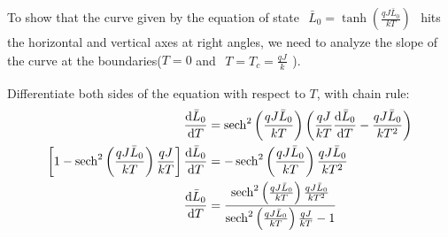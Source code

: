\documentclass[../../main.tex]{subfiles}
\begin{document}
  To show that the curve given by the equation of state $\begin{aligned}
    \bar{L}_{0} = \tanh{\left(\frac{qJ\bar{L}_{0}}{kT}\right)} 
  \end{aligned}$ hits the horizontal and vertical axes at right angles, we need to analyze the slope of the curve at the boundaries($T = 0$ and $\begin{aligned}
      T = T_{c} = \frac{qJ}{k}
    \end{aligned}$).

    Differentiate both sides of the equation with respect to $T$, with chain rule:
    \begin{align*}
      \frac{\mathrm{d}\bar{L}_{0}}{\mathrm{d}T} &= \operatorname{sech}^{2}\left(\frac{qJ\bar{L}_{0}}{kT}\right)\left(\frac{qJ}{kT}\frac{\mathrm{d}\bar{L}_{0}}{\mathrm{d}T} - \frac{qJ\bar{L}_{0}}{kT^{2}}\right)\\
      \left[ 1 - \operatorname{sech}^{2}\left(\frac{qJ\bar{L}_{0}}{kT}\right)\frac{qJ}{kT}\right]\frac{\mathrm{d}\bar{L}_{0}}{\mathrm{d}T} &= -\operatorname{sech}^{2}\left(\frac{qJ\bar{L}_{0}}{kT}\right)\frac{qJ\bar{L}_{0}}{kT^{2}}\\
      \frac{\mathrm{d}\bar{L}_{0}}{\mathrm{d}T} &= \frac{\operatorname{sech}^{2}\left(\frac{qJ\bar{L}_{0}}{kT}\right)\frac{qJ\bar{L}_{0}}{kT^{2}}}{\operatorname{sech}^{2}\left(\frac{qJ\bar{L}_{0}}{kT}\right)\frac{qJ}{kT}-1}
    \end{align*}
\end{document}

